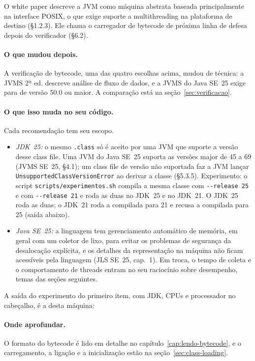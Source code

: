 O white paper descreve a JVM como máquina abstrata baseada
principalmente na interface POSIX, o que exige suporte a multithreading
na plataforma de destino (§1.2.3). Ele chama o carregador de bytecode de
próxima linha de defesa depois do verificador (§6.2).

\paragraph{O que mudou depois.}
A verificação de bytecode, uma das quatro escolhas acima, mudou de
técnica: a JVMS 2ª ed. descreve análise de fluxo de dados, e a JVMS do
Java SE~25 exige  para  de versão 50.0 ou maior. A comparação está
na seção~\ref{sec:verificacao}.

\paragraph{O que isso muda no seu código.}
Cada recomendação tem seu escopo.
\begin{itemize}
\item \emph{JDK~25:} o mesmo \texttt{.class} só é aceito por uma JVM
  que suporte a versão desse class file. Uma JVM do Java
  SE~25 suporta as versões major de 45 a 69 (JVMS SE~25, §4.1); um class
  file de versão não suportada faz a JVM lançar
  \texttt{UnsupportedClassVersionError} ao derivar a classe (§5.3.5).
  Experimento: o script \texttt{scripts/experimentos.sh} compila a mesma
  classe com \texttt{-{}-release 25} e com \texttt{-{}-release 21} e roda
  as duas no JDK~25 e no JDK~21. O JDK~25 roda as duas; o JDK~21 roda a
  compilada para 21 e recusa a compilada para 25 (saída abaixo).
\item \emph{Java SE~25:} a linguagem tem gerenciamento automático de
  memória, em geral com um coletor de lixo, para evitar os problemas de
  segurança da desalocação explícita, e os detalhes da representação na
  máquina não ficam acessíveis pela linguagem (JLS SE~25, cap.~1). Em
  troca, o tempo de coleta e o comportamento de threads entram no seu
  raciocínio sobre desempenho, temas das seções seguintes.
\end{itemize}

A saída do experimento do primeiro item, com JDK, CPUs e processador no
cabeçalho, é a desta máquina:



\paragraph{Onde aprofundar.}
O formato do bytecode é lido em detalhe no capítulo~\ref{cap:lendo-bytecode},
e o carregamento, a ligação e a inicialização estão na
seção~\ref{sec:class-loading}.
